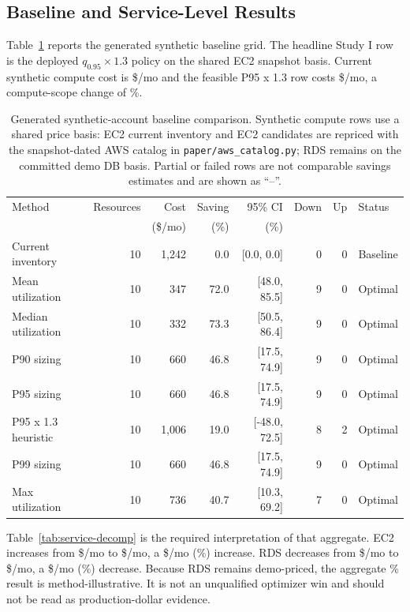 \documentclass[11pt]{article}
\begin{document}
\subsection{Baseline and Service-Level Results}

Table~\ref{tab:baselines} reports the generated synthetic baseline grid. The
headline Study I row is the deployed $q_{0.95}\times1.3$ policy on the shared
EC2 snapshot basis. Current synthetic compute cost is
\$\evidComputeCurrent{}/mo and the feasible P95 x 1.3 row costs
\$\evidPfiveCost{}/mo, a compute-scope change of \evidAggregateDeltaPct\%.

\begin{table}[t]
\caption{Generated synthetic-account baseline comparison. Synthetic compute
rows use a shared price basis: EC2 current
inventory and EC2 candidates are repriced with the snapshot-dated AWS catalog
in \texttt{paper/aws\_catalog.py}; RDS remains on the committed demo DB basis.
Partial or failed rows are not comparable savings estimates and are shown as
``--''.}
\label{tab:baselines}
\centering
\small
\renewcommand{\arraystretch}{1.08}
\setlength{\tabcolsep}{3.5pt}
\begin{tabular}{@{}l r r r r r r l@{}}
\toprule
Method & Resources & Cost & Saving & 95\% CI & Down & Up & Status \\
 & & (\$/mo) & (\%) & (\%) & & & \\
\midrule
Current inventory & 10 & 1,242 & 0.0 & [0.0, 0.0] & 0 & 0 & Baseline \\
Mean utilization & 10 & 347 & 72.0 & [48.0, 85.5] & 9 & 0 & Optimal \\
Median utilization & 10 & 332 & 73.3 & [50.5, 86.4] & 9 & 0 & Optimal \\
P90 sizing & 10 & 660 & 46.8 & [17.5, 74.9] & 9 & 0 & Optimal \\
P95 sizing & 10 & 660 & 46.8 & [17.5, 74.9] & 9 & 0 & Optimal \\
P95 x 1.3 heuristic & 10 & 1,006 & 19.0 & [-48.0, 72.5] & 8 & 2 & Optimal \\
P99 sizing & 10 & 660 & 46.8 & [17.5, 74.9] & 9 & 0 & Optimal \\
Max utilization & 10 & 736 & 40.7 & [10.3, 69.2] & 7 & 0 & Optimal \\
\bottomrule
\end{tabular}
\end{table}

Table~\ref{tab:service-decomp} is the required interpretation of that
aggregate. EC2 increases from \$\evidEcTwoCurrent{}/mo to
\$\evidEcTwoOptimized{}/mo, a \$\evidEcTwoDelta{}/mo
(\evidEcTwoDeltaPct\%) increase. RDS decreases from
\$\evidRdsCurrent{}/mo to \$\evidRdsOptimized{}/mo, a
\$\evidRdsSavings{}/mo (\evidRdsSavingsPct\%) decrease. Because RDS remains
demo-priced, the aggregate \evidAggregateDeltaPct\% result is
method-illustrative. It is not an unqualified optimizer win and should not be
read as production-dollar evidence.
\end{document}
